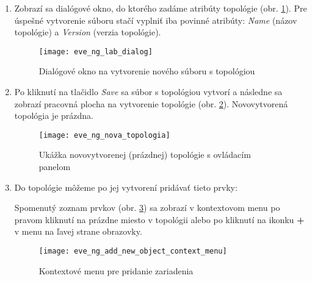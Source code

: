 \begin{enumerate}[noitemsep]
    \item Zobrazí sa dialógové okno, do ktorého zadáme atribúty topológie (obr. \ref{obr:eve_ng_lab_dialog}). Pre úspešné vytvorenie súboru stačí vyplniť iba povinné atribúty: \emph{Name} (názov topológie) a \emph{Version} (verzia topológie).

\begin{figure}
    \centering
    \texttt{[image: eve\_ng\_lab\_dialog]}
    \caption{Dialógové okno na vytvorenie nového súboru s topológiou}
    \label{obr:eve_ng_lab_dialog}
\end{figure}

    \item Po kliknutí na tlačidlo \emph{Save} sa súbor s topológiou vytvorí a následne sa zobrazí pracovná plocha na vytvorenie topológie (obr. \ref{obr:eve_ng_nova_topologia}). Novovytvorená topológia je prázdna.

\begin{figure}
    \centering
    \texttt{[image: eve\_ng\_nova\_topologia]}
    \caption{Ukážka novovytvorenej (prázdnej) topológie s ovládacím panelom}
    \label{obr:eve_ng_nova_topologia}
\end{figure}

    \item Do topológie môžeme po jej vytvorení pridávať tieto prvky:
    
    
    Spomenutý zoznam prvkov (obr. \ref{obr:eve_ng_add_new_object_context_menu}) sa zobrazí v kontextovom menu po pravom kliknutí na prázdne miesto v topológii alebo po kliknutí na ikonku \textbf{+} v menu na ľavej strane obrazovky.
    
\begin{figure}
    \centering
    \texttt{[image: eve\_ng\_add\_new\_object\_context\_menu]}
    \caption{Kontextové menu pre pridanie zariadenia}
    \label{obr:eve_ng_add_new_object_context_menu}
\end{figure}
    

\end{enumerate}
